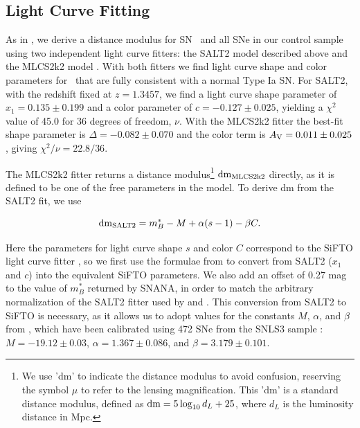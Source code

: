 \subsection{Light Curve Fitting}
\label{sec:LightCurveFitting}


As in \citealt{Patel:2014}, we derive a distance modulus for
SN \tomas\ and all SNe in our control sample using two independent
light curve fitters: the SALT2 model described above and the MLCS2k2
model \citep{Jha:2007}.    With both fitters we find light curve
shape and color parameters for \tomas\ that are fully consistent with
a normal Type Ia SN.  For SALT2, with the
redshift fixed at $z=1.3457$, we find a light curve shape
parameter of $x_1=0.135\pm0.199$ and a color parameter of
$c=-0.127\pm0.025$, yielding a $\chi^2$ value of 45.0 for 36 degrees
of freedom, $\nu$.  With the MLCS2k2 fitter the best-fit shape
parameter is $\Delta=-0.082\pm0.070$ and the color term is
$A_{\rm V}=0.011\pm0.025$, giving $\chi^2/\nu=22.8/36$.


 The MLCS2k2 fitter returns a distance
modulus\footnote{We use 'dm' to indicate the distance modulus to avoid
confusion, reserving the symbol $\mu$ to refer to the lensing
magnification. This 'dm' is a standard distance modulus, defined as
${\rm dm}=5\log_{10}d_L+25$, where $d_L$ is the luminosity distance in
Mpc.}  $\rm{dm}_{\rm MLCS2k2}$ directly, as it is defined to be one of
the free parameters in the model. To derive dm from the SALT2 fit, we
use

\begin{equation} \label{eqn:dmSALT2}
 {\rm dm}_{\rm SALT2} = m_B^* - M + \alpha(s-1) - \beta C.
\end{equation}

\noindent  Here the parameters for light curve shape $s$ and color $C$ 
correspond to the SiFTO light curve fitter \citep{Conley:2008}, so we
first use the formulae from \citet{Guy:2010} to convert from SALT2
($x_1$ and $c$) into the equivalent SiFTO parameters.  We also add an
offset of 0.27 mag to the value of $m_B^*$ returned by SNANA, in order
to match the arbitrary normalization of the SALT2 fitter used
by \citet{Guy:2010} and \citet{Sullivan:2011}. This conversion from SALT2 to SiFTO is necessary, as it allows
us to adopt values for the constants $M$, $\alpha$, and $\beta$
from \citet{Sullivan:2011}, which have been calibrated using 472 SNe
from the SNLS3 sample \citep{Conley:2011}: $M=-19.12\pm0.03$,
$\alpha=1.367\pm0.086$, and $\beta=3.179\pm0.101$.



